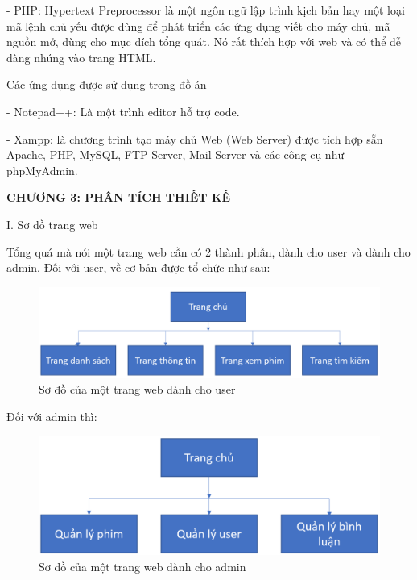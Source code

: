 \documentclass{report}
\begin{document}
\smallskip
- PHP: Hypertext Preprocessor là một ngôn ngữ lập trình kịch bản hay một loại mã lệnh chủ yếu được dùng để phát triển các ứng dụng viết cho máy chủ, mã nguồn mở, dùng cho mục đích tổng quát. Nó rất thích hợp với web và có thể dễ dàng nhúng vào trang HTML.

\bigskip
\changefontsizes{14pt}
\setlength{\parindent}{0cm}
Các ứng dụng được sử dụng trong đồ án

\changefontsizes{13pt}
\setlength{\parindent}{1cm}
- Notepad++: Là một trình editor hỗ trợ code.

\smallskip
- Xampp: là chương trình tạo máy chủ Web (Web Server) được tích hợp sẵn Apache, PHP, MySQL, FTP Server, Mail Server và các công cụ như phpMyAdmin.

\newpage
\changefontsizes{16pt}
\centerline{\textbf{CHƯƠNG 3: PHÂN TÍCH THIẾT KẾ}}

\bigskip
\setlength{\parindent}{0cm}
\changefontsizes{14pt}
I. Sơ đồ trang web

\setlength{\parindent}{1cm}
\changefontsizes{13pt}
Tổng quá mà nói một trang web cần có 2 thành phần, dành cho user và dành cho admin. Đối với user, về cơ bản được tổ chức như sau:

\begin{center}
    \begin{figure}[htp]
    \begin{center}
     \includegraphics[scale=0.4]{31.png}
    \end{center}
    \caption{Sơ đồ của một trang web dành cho user}
    \label{refhinh1}
    \end{figure}
\end{center}

Đối với admin thì:

\begin{center}
    \begin{figure}[htp]
    \begin{center}
     \includegraphics[scale=0.4]{32.png}
    \end{center}
    \caption{Sơ đồ của một trang web dành cho admin}
    \label{refhinh1}
    \end{figure}
\end{center}
\end{document}
